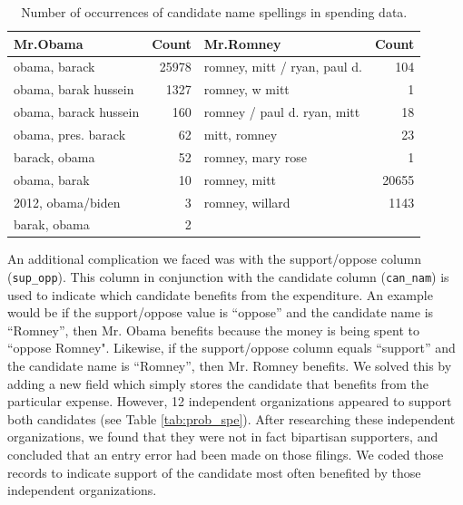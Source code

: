 \documentclass[11pt]{article}\usepackage{graphicx, color}
\begin{document}
\begin{table}[ht]
\begin{center}
\begin{tabular}{lrlr}
  \hline
Mr.Obama & Count & Mr.Romney & Count \\ 
  \hline
obama, barack & 25978 & romney, mitt / ryan, paul d. & 104 \\ 
  obama, barak hussein & 1327 & romney, w mitt &   1 \\ 
  obama, barack hussein & 160 & romney / paul d. ryan, mitt &  18 \\ 
  obama, pres. barack &  62 & mitt, romney &  23 \\ 
  barack, obama &  52 & romney, mary rose &   1 \\ 
  obama, barak &  10 & romney, mitt & 20655 \\ 
  2012, obama/biden &   3 & romney, willard & 1143 \\ 
  barak, obama &   2 &  &  \\ 
   \hline
\end{tabular}
\caption{Number of occurrences of candidate name spellings in spending data.}
\label{tab:can_nam}
\end{center}
\end{table}



An additional complication we faced was with the support/oppose column (\texttt{sup\_opp}). This column in conjunction with the candidate column (\texttt{can\_nam}) is used to indicate which candidate benefits from the expenditure. An example would be if the support/oppose value is ``oppose'' and the candidate name is ``Romney'', then Mr. Obama benefits because the money is being spent to ``oppose Romney". Likewise, if the support/oppose column equals ``support'' and the candidate name is ``Romney'', then Mr. Romney benefits. We solved this by adding a new field which simply stores the candidate that benefits from the particular expense.  However, 12 independent organizations appeared to support both candidates (see Table \ref{tab:prob_spe}). After researching these independent organizations, we found that they were not in fact bipartisan supporters, and concluded that an entry error had been made on those filings. We coded those records to indicate support of the candidate most often benefited by those independent organizations.
\end{document}
